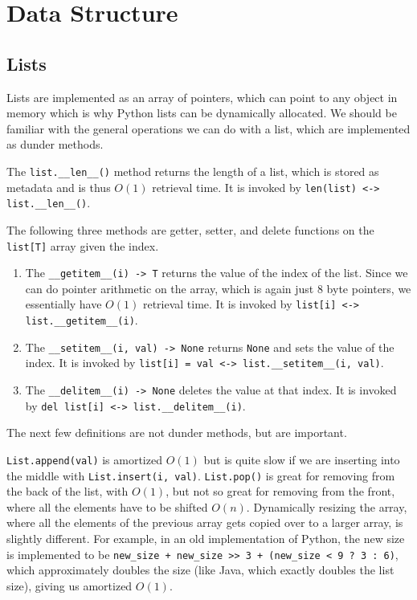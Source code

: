 \section{Data Structure}

\subsection{Lists}

  Lists are implemented as an array of pointers, which can point to any object in memory which is why Python lists can be dynamically allocated. We should be familiar with the general operations we can do with a list, which are implemented as dunder methods. 

  \begin{definition}[Length]
    \label{def:length}
    The \texttt{list.\_\_len\_\_()} method returns the length of a list, which is stored as metadata and is thus $O(1)$ retrieval time. It is invoked by \texttt{len(list) <-> list.\_\_len\_\_()}. 
  \end{definition}

  \begin{definition}
    \label{def:set-item-get-item-del-item}
    The following three methods are getter, setter, and delete functions on the \texttt{list[T]} array given the index. 
    \begin{enumerate}
      \item The \texttt{\_\_getitem\_\_(i) -> T} returns the value of the index of the list. Since we can do pointer arithmetic on the array, which is again just 8 byte pointers, we essentially have $O(1)$ retrieval time. It is invoked by \texttt{list[i] <-> list.\_\_getitem\_\_(i)}. 
      \item The \texttt{\_\_setitem\_\_(i, val) -> None} returns \texttt{None} and sets the value of the index. It is invoked by \texttt{list[i] = val <-> list.\_\_setitem\_\_(i, val)}. 
      \item The \texttt{\_\_delitem\_\_(i) -> None} deletes the value at that index. It is invoked by \texttt{del list[i] <-> list.\_\_delitem\_\_(i)}. 
    \end{enumerate}
  \end{definition}

  The next few definitions are not dunder methods, but are important. 
  \begin{definition}
    \label{def:append-insert-pop}
    \texttt{List.append(val)} is amortized $O(1)$ but is quite slow if we are inserting into the middle with \texttt{List.insert(i, val)}. 
    \texttt{List.pop()} is great for removing from the back of the list, with $O(1)$, but not so great for removing from the front, where all the elements have to be shifted $O(n)$. 
    Dynamically resizing the array, where all the elements of the previous array gets copied over to a larger array, is slightly different. For example, in an old implementation of Python, the new size is implemented to be \texttt{new\_size + new\_size >> 3 + (new\_size < 9 ? 3 : 6)}, which approximately doubles the size (like Java, which exactly doubles the list size), giving us amortized $O(1)$. 
  \end{definition}

